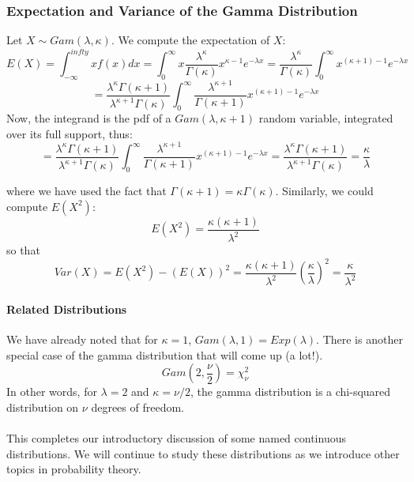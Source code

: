 \documentclass[12pt]{article} %
\begin{document}
\subsubsection{Expectation and Variance of the Gamma Distribution}
Let $X \sim Gam(\lambda,\kappa)$.  We compute the expectation of $X$:
$$E(X) = \int_{-\infty}^{infty}x f(x) dx = \int_0^\infty x \frac{\lambda^\kappa}{\Gamma(\kappa)}x^{\kappa-1} e^{-\lambda x} = \frac{\lambda^\kappa}{\Gamma(\kappa)}\int_0^\infty x^{(\kappa+1)-1} e^{-\lambda x}$$
$$ =  \frac{\lambda^\kappa\Gamma(\kappa+1)}{\lambda^{\kappa+1}\Gamma(\kappa)}\int_0^\infty \frac{\lambda^{\kappa+1}}{\Gamma(\kappa+1)}x^{(\kappa+1)-1} e^{-\lambda x}$$
Now, the integrand is the pdf of a $Gam(\lambda,\kappa+1)$ random variable, integrated over its full support, thus:
$$ =  \frac{\lambda^\kappa\Gamma(\kappa+1)}{\lambda^{\kappa+1}\Gamma(\kappa)}\int_0^\infty \frac{\lambda^{\kappa+1}}{\Gamma(\kappa+1)}x^{(\kappa+1)-1} e^{-\lambda x} = \frac{\lambda^\kappa\Gamma(\kappa+1)}{\lambda^{\kappa+1}\Gamma(\kappa)} = \frac{\kappa}{\lambda}$$

where we have used the fact that $\Gamma(\kappa+1) = \kappa\Gamma(\kappa)$. Similarly, we could compute $E(X^2)$:
$$E(X^2) = \frac{\kappa(\kappa+1)}{\lambda^2}$$
so that 
$$Var(X) = E(X^2)-\left(E(X)\right)^2 =   \frac{\kappa(\kappa+1)}{\lambda^2}\left(\frac{\kappa}{\lambda}\right)^2 = \frac{\kappa}{\lambda^2}$$
\paragraph{Related Distributions}
We have already noted that for $\kappa=1$, $Gam(\lambda,1)=Exp(\lambda)$. There is another special case of the gamma distribution that will come up (a lot!).
$$Gam(2,\frac{\nu}2) =\chi^2_\nu$$
In other words, for $\lambda =2$ and $\kappa=\nu/2$, the gamma distribution is a chi-squared distribution on $\nu$ degrees of freedom.\\\\
This completes our introductory discussion of some named continuous distributions. We will continue to study these distributions as we introduce other topics in probability theory.
\end{document}
